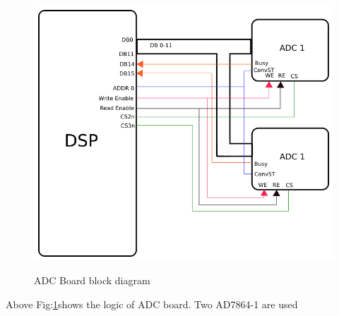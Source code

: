 \begin{figure}[ht]
\includegraphics[width=\columnwidth]{fig/ADC_board.png}
\label{fig:adc_board}
\caption{ADC Board block diagram}
\end{figure}
Above Fig:\ref{fig:adc_board}shows the logic of ADC board. Two AD7864-1 are used
